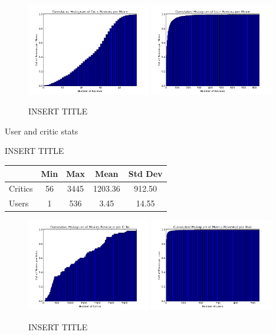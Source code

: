 \documentclass[12pt]{article}
\begin{document}
 \begin{figure}[H]
    \centering
    \includegraphics[width=0.48\textwidth]{plots/plot_m_mov_top.png}
    \includegraphics[width=0.48\textwidth]{plots/plot_m_mov_usr.png}
    \caption{INSERT TITLE}
    \label{fig:m_mov}
\end{figure}



User and critic stats
\begin{table}[H]
 \centering
 INSERT TITLE \\
 \begin{tabular}{| l | c | c | c | c |}
 \hline
 &  Min & Max & Mean & Std Dev  \\
 \hline
 Critics & 56 & 3445 & 1203.36 & 912.50 \\
 Users & 1 & 536 & 3.45 & 14.55 \\
 \hline
 \end{tabular}
 \end{table}

 \begin{figure}[H]
    \centering
    \includegraphics[width=0.48\textwidth]{plots/plot_m_crit_top.png}
    \includegraphics[width=0.48\textwidth]{plots/plot_m_crit_usr.png}
    \caption{INSERT TITLE}
    \label{fig:m_crit}
\end{figure}
\end{document}

